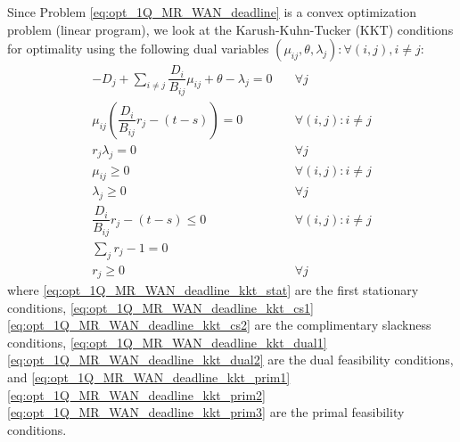 Since Problem \eqref{eq:opt_1Q_MR_WAN_deadline} is a convex optimization problem (linear program), we look at the Karush-Kuhn-Tucker (KKT) conditions for optimality using the following dual variables $(\mu_{ij},\theta,\lambda_j):\forall (i,j),i\neq j$:
\begin{subequations}\label{eq:opt_1Q_MR_WAN_deadline_kkt}
	\begin{align}
		-D_j+\sum_{i\neq j}\dfrac{D_i}{B_{ij}}\mu_{ij} + \theta - \lambda_j = 0 & \quad \forall j \label{eq:opt_1Q_MR_WAN_deadline_kkt_stat}\\
		\mu_{ij}\left(\dfrac{D_{i}}{B_{ij}}r_{j} - (t - s)\right) = 0 & \quad \forall (i,j):i\neq j \label{eq:opt_1Q_MR_WAN_deadline_kkt_cs1}\\
		r_j\lambda_j = 0 & \quad \forall j \label{eq:opt_1Q_MR_WAN_deadline_kkt_cs2}\\
		\mu_{ij} \geq 0 & \quad \forall (i,j):i\neq j \label{eq:opt_1Q_MR_WAN_deadline_kkt_dual1}\\
		\lambda_j \geq 0  & \quad \forall j \label{eq:opt_1Q_MR_WAN_deadline_kkt_dual2}\\
		\dfrac{D_{i}}{B_{ij}}r_{j} - (t - s) \leq 0  & \quad \forall (i,j):i\neq j \label{eq:opt_1Q_MR_WAN_deadline_kkt_prim1}\\
		\sum_{j}r_{j} - 1 = 0 & \label{eq:opt_1Q_MR_WAN_deadline_kkt_prim2}\\
		r_{j} \geq 0 & \quad \forall j \label{eq:opt_1Q_MR_WAN_deadline_kkt_prim3}
	\end{align}
\end{subequations}
where \eqref{eq:opt_1Q_MR_WAN_deadline_kkt_stat} are the first stationary conditions, \eqref{eq:opt_1Q_MR_WAN_deadline_kkt_cs1} \eqref{eq:opt_1Q_MR_WAN_deadline_kkt_cs2} are the complimentary slackness conditions, \eqref{eq:opt_1Q_MR_WAN_deadline_kkt_dual1} \eqref{eq:opt_1Q_MR_WAN_deadline_kkt_dual2} are the dual feasibility conditions, and \eqref{eq:opt_1Q_MR_WAN_deadline_kkt_prim1} \eqref{eq:opt_1Q_MR_WAN_deadline_kkt_prim2} \eqref{eq:opt_1Q_MR_WAN_deadline_kkt_prim3} are the primal feasibility conditions.

